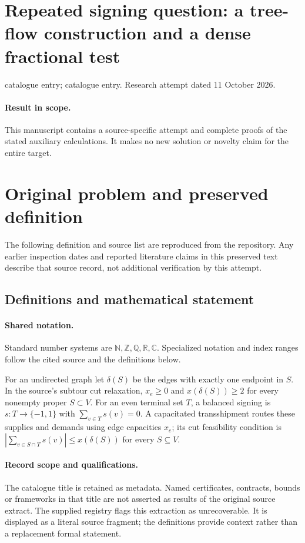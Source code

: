 \documentclass[11pt]{article}
\begin{document}
\section*{Repeated signing question: a tree-flow construction and a dense fractional test}
\noindent catalogue entry; catalogue entry. Research attempt dated 11 October 2026.
\paragraph{Result in scope.}This manuscript contains a source-specific attempt and complete proofs of the stated auxiliary calculations. It makes no new solution or novelty claim for the entire target.
\section{Original problem and preserved definition}
The following definition and source list are reproduced from the repository. Any earlier inspection dates and reported literature claims in this preserved text describe that source record, not additional verification by this attempt.
\subsection{Definitions and mathematical statement}

\paragraph{Shared notation.}Standard number systems are $\mathbb N,\mathbb Z,\mathbb Q,\mathbb R,\mathbb C$. Specialized notation and index ranges follow the cited source and the definitions below.


For an undirected graph let $\delta(S)$ be the edges with exactly one endpoint in $S$. In the source's subtour cut relaxation, $x_e\geq0$ and $x(\delta(S))\geq2$ for every nonempty proper $S\subset V$. For an even terminal set $T$, a balanced signing is $s:T\to\{-1,1\}$ with $\sum_{v\in T}s(v)=0$. A capacitated transshipment routes these supplies and demands using edge capacities $x_e$; its cut feasibility condition is $|\sum_{v\in S\cap T}s(v)|\leq x(\delta(S))$ for every $S\subseteq V$.
\paragraph{Record scope and qualifications.}
The catalogue title is retained as metadata. Named certificates, contracts, bounds or frameworks in that title are not asserted as results of the original source extract.
The supplied registry flags this extraction as unrecoverable. It is displayed as a literal source fragment; the definitions provide context rather than a replacement formal statement.
\end{document}
